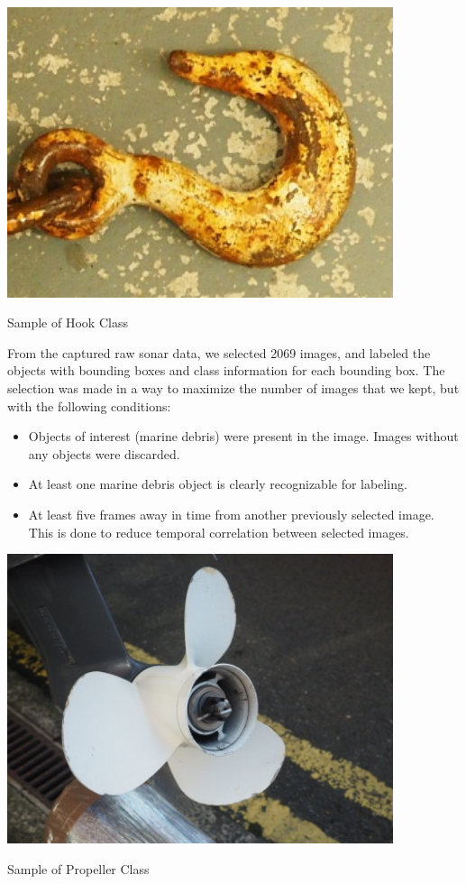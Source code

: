 \begin{marginfigure}[1cm]
    \centering
    \includegraphics[width = 0.85\textwidth]{chapters/images/dataset/hook.jpg}
    \caption{Sample of Hook Class}
    \label{md:hook}
\end{marginfigure}

From the captured raw sonar data, we selected 2069 images, and labeled the objects with bounding boxes and class information for each bounding box. The selection was made in a way to maximize the number of images that we kept, but with the following conditions:

\begin{itemize}
    \item Objects of interest (marine debris) were present in the image. Images without any objects were discarded.
    \item At least one marine debris object is clearly recognizable for labeling.
    \item At least five frames away in time from another previously selected image. This is done to reduce temporal correlation between selected images.
\end{itemize}

\begin{marginfigure}[-4cm]
    \centering
    \includegraphics[width = 0.85\textwidth]{chapters/images/dataset/propeller.jpg}
    \caption{Sample of Propeller Class}
    \label{md:propeller}
\end{marginfigure}

